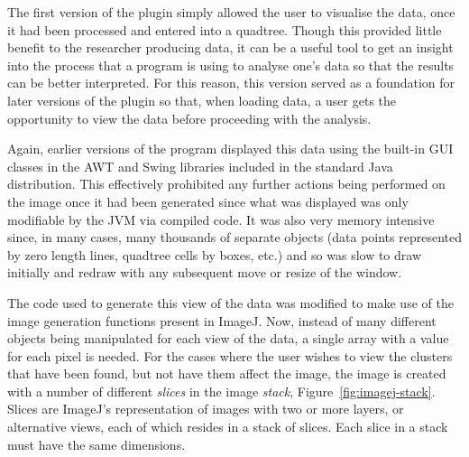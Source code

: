 The first version of the plugin simply allowed the user to visualise the data,
once it had been processed and entered into a quadtree. Though this provided
little benefit to the researcher producing data, it can be a useful tool to get
an insight into the process that a program is using to analyse one's data so
that the results can be better interpreted. For this reason, this version
served as a foundation for later versions of the plugin so that, when loading
data, a user gets the opportunity to view the data before proceeding with the
analysis.

Again, earlier versions of the program displayed this data using the built-in
GUI classes in the AWT\cite{zukowski1997java} and Swing\cite{loy2002java}
libraries included in the standard Java distribution. This effectively
prohibited any further actions being performed on the image once it had been
generated since what was displayed was only modifiable by the JVM via compiled
code. It was also very memory intensive since, in many cases, many thousands of
separate objects (data points represented by zero length lines, quadtree cells
by boxes, etc.) and so was slow to draw initially and redraw with any
subsequent move or resize of the window.

The code used to generate this view of the data was modified to make use of the
image generation functions present in ImageJ. Now, instead of many different
objects being manipulated for each view of the data, a single array with a
value for each pixel is needed. For the cases where the user wishes to view the
clusters that have been found, but not have them affect the image, the image is
created with a number of different \emph{slices} in the image \emph{stack},
Figure~\ref{fig:imagej-stack}. Slices are ImageJ's representation of images
with two or more layers, or alternative views, each of which resides in a stack
of slices. Each slice in a stack must have the same dimensions.




